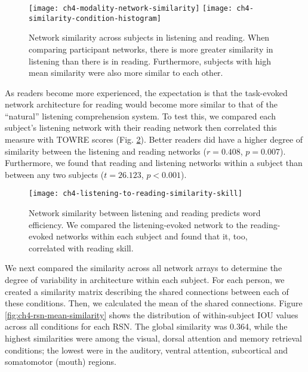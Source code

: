 \begin{figure}[t!]
	\centering
	\texttt{[image: ch4-modality-network-similarity]}
	\texttt{[image: ch4-similarity-condition-histogram]}
    \caption[Network similarity across subjects in listening and reading.] {Network similarity across subjects in listening and reading. When comparing participant networks, there is more greater similarity in listening than there is in reading. Furthermore, subjects with high mean similarity were also more similar to each other.}
	\label{fig:ch4-modality-network-similarity}
\end{figure}

As readers become more experienced, the expectation is that the task-evoked network architecture for reading would become more similar to that of the ``natural'' listening comprehension system. To test this, we compared each subject's listening network with their reading network then correlated this measure with TOWRE scores (Fig. \ref{fig:ch4-modality-similarity-to-reading}). Better readers did have a higher degree of similarity between the listening and reading networks ($r = 0.408$, $p = 0.007$). Furthermore, we found that reading and listening networks within a subject than between any two subjects ($t = 26.123$, $p < 0.001$). 

\begin{figure}[t!]
	\centering
	\texttt{[image: ch4-listening-to-reading-similarity-skill]}
    \caption[Network similarity between listening and reading predicts word efficiency]{Network similarity between listening and reading predicts word efficiency. We compared the listening-evoked network to the reading-evoked networks within each subject and found that it, too, correlated with reading skill.}
	\label{fig:ch4-modality-similarity-to-reading}
\end{figure}

We next compared the similarity across all network arrays to determine the degree of variability in architecture within each subject. For each person, we created a similarity matrix describing the shared connections between each of these conditions. Then, we calculated the mean of the shared connections. Figure \ref{fig:ch4-rsn-mean-similarity} shows the distribution of within-subject IOU values across all conditions for each RSN. The global similarity was 0.364, while the highest similarities were among the visual, dorsal attention and memory retrieval conditions; the lowest were in the auditory, ventral attention, subcortical and somatomotor (mouth) regions.

